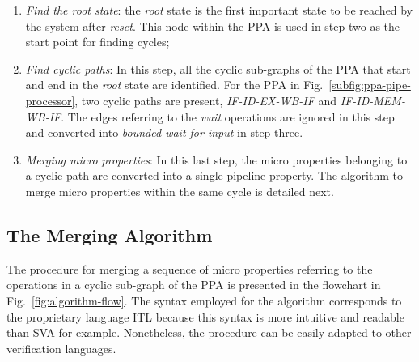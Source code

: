 \begin{enumerate}
\item \textit{Find the root state}: the \textit{root} state is the first important state to be reached by the system after \textit{reset}. This node within the PPA is used in step two as the start point for finding cycles;
\item \textit{Find cyclic paths}: In this step, all the cyclic sub-graphs of the PPA that start and end in the \textit{root} state are identified. For the PPA in Fig.~\ref{subfig:ppa-pipe-processor}, two cyclic paths are present, \textit{IF-ID-EX-WB-IF} and \textit{IF-ID-MEM-WB-IF}. The edges referring to the \textit{wait} operations are ignored in this step and converted into \textit{bounded wait for input} in step three.
\item \textit{Merging micro properties}: In this last step, the micro properties belonging to a cyclic path are converted into a single pipeline property. The algorithm to merge micro properties within the same cycle is detailed next. 
\end{enumerate}

\subsection*{The Merging Algorithm}

The procedure for merging a sequence of micro properties referring to the operations in a cyclic sub-graph of the PPA is presented in the flowchart in Fig.~\ref{fig:algorithm-flow}. The syntax employed for the algorithm corresponds to the proprietary language ITL \cite{onespin} because this syntax is more intuitive and readable than SVA for example. Nonetheless, the procedure can be easily adapted to other verification languages. 

